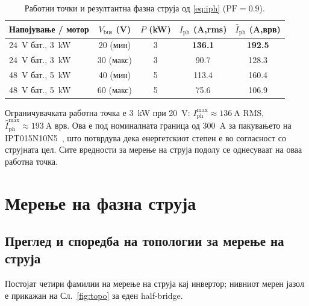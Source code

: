 \documentclass[journal,onecolumn,11pt]{IEEEtran}
\newcommand{\Vdcbus}{V_{\mathrm{bus}}}
\newcommand{\Iphrms}{I_{\mathrm{ph}}}
\begin{document}
\begin{table}[t]
\centering
\caption{Работни точки и резултантна фазна струја од \eqref{eq:iph} (\(\mathrm{PF}=0.9\)).}
\label{tab:env}
\small
\begin{tabular}{l c c c c}
\toprule
Напојување / мотор & \(\Vdcbus\) (V) & \(P\) (kW) & \(\Iphrms\) (A,rms) & \(\hat I_{\mathrm{ph}}\) (A,врв)\\
\midrule
\SI{24}{\volt} бат., \SI{3}{\kilo\watt} & 20 (мин) & 3 & \textbf{136.1} & \textbf{192.5}\\
\SI{24}{\volt} бат., \SI{3}{\kilo\watt} & 30 (макс) & 3 & 90.7 & 128.3\\
\SI{48}{\volt} бат., \SI{5}{\kilo\watt} & 40 (мин) & 5 & 113.4 & 160.4\\
\SI{48}{\volt} бат., \SI{5}{\kilo\watt} & 60 (макс) & 5 & 75.6 & 106.9\\
\bottomrule
\end{tabular}
\end{table}

Ограничувачката работна точка е \SI{3}{\kilo\watt} при \SI{20}{\volt}:
\(\Iphrms^{\max}\approx\SI{136}{\ampere}\) RMS, \(\hat I_{\mathrm{ph}}^{\max}\approx\SI{193}{\ampere}\)
врв. Ова е под номиналната граница од \SI{300}{\ampere} за пакувањето на IPT015N10N5~\cite{ipt015part},
што потврдува дека енергетскиот степен е во согласност со струјната цел. Сите вредности за мерење на
струја подолу се однесуваат на оваа работна точка.

\section{Мерење на фазна струја}\label{sec:current}

\subsection{Преглед и споредба на топологии за мерење на струја}\label{sec:csurvey}
Постојат четири фамилии на мерење на струја кај инвертор; нивниот мерен јазол е прикажан на
Сл.~\ref{fig:topo} за еден half-bridge.
\end{document}
